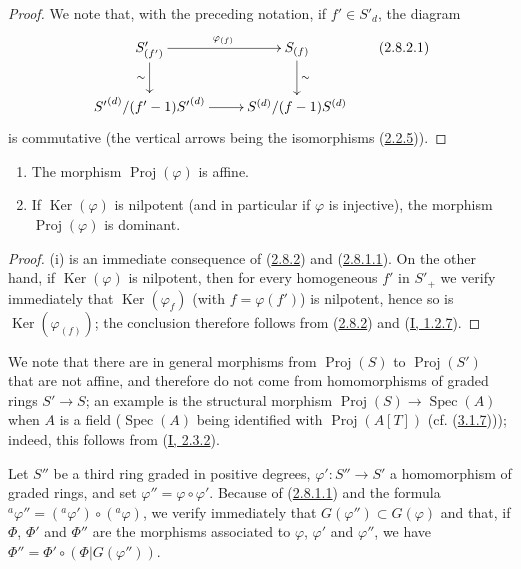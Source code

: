 \begin{proof}
We note that, with the preceding notation, if $f'\in S'_d$, the diagram
\[
\label{II.2.8.2.1}
  \xymatrix{
    S'_{(f')}\ar[r]^{\varphi_{(f)}}\ar[d]_{\sim}
    & S_{(f)}\ar[d]^{\sim}\\
    {S'}^{(d)}/(f'-1){S'}^{(d)}\ar[r]
    & S^{(d)}/(f-1)S^{(d)}
  }
\tag{2.8.2.1}
\]
is commutative (the vertical arrows being the isomorphisms
(\hyperref[II.2.2.5]{2.2.5})).
\end{proof}

\begin{corollary}[2.8.3]
\label{II.2.8.3}
\begin{enumerate}
  \item[\rm(i)] The morphism $\operatorname{Proj}(\varphi)$ is affine.
  \item[\rm(ii)] If $\operatorname{Ker}(\varphi)$ is nilpotent (and in
    particular if $\varphi$ is injective), the morphism
    $\operatorname{Proj}(\varphi)$ is dominant.
\end{enumerate}
\end{corollary}

\begin{proof}
(i) is an immediate consequence of (\hyperref[II.2.8.2]{2.8.2}) and
(\hyperref[II.2.8.1.1]{2.8.1.1}). On the other hand, if
$\operatorname{Ker}(\varphi)$ is nilpotent, then for every homogeneous $f'$ in
$S'_+$ we verify immediately that $\operatorname{Ker}(\varphi_f)$ (with
$f=\varphi(f')$) is nilpotent, hence so is
$\operatorname{Ker}(\varphi_{(f)})$; the conclusion therefore follows from
(\hyperref[II.2.8.2]{2.8.2}) and
(\hyperref[I.1.2.7]{I, 1.2.7}).
\end{proof}

We note that there are in general morphisms from $\operatorname{Proj}(S)$
to $\operatorname{Proj}(S')$ that are not affine, and therefore do not come
from homomorphisms of graded rings $S'\to S$; an example is the structural
morphism $\operatorname{Proj}(S)\to\operatorname{Spec}(A)$ when $A$ is a field
($\operatorname{Spec}(A)$ being identified with
$\operatorname{Proj}(A[T])$ (cf. (\hyperref[II.3.1.7]{3.1.7}))); indeed,
this follows from (\hyperref[I.2.3.2]{I, 2.3.2}).

\begin{env}[2.8.4]
\label{II.2.8.4}
Let $S''$ be a third ring graded in positive degrees,
$\varphi':S''\to S'$ a homomorphism of graded rings, and set
$\varphi''=\varphi\circ\varphi'$. Because of
(\hyperref[II.2.8.1.1]{2.8.1.1}) and the formula
${}^a\varphi''=({}^a\varphi')\circ({}^a\varphi)$, we verify immediately that
$G(\varphi'')\subset G(\varphi)$ and that, if $\Phi$, $\Phi'$ and $\Phi''$
are the morphisms associated to $\varphi$, $\varphi'$ and $\varphi''$, we have
$\Phi''=\Phi'\circ(\Phi|G(\varphi''))$.
\end{env}

